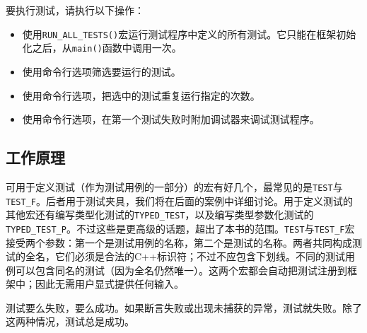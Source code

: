 
要执行测试，请执行以下操作：



\begin{itemize}
\item 使用\texttt{RUN\_\allowbreak{}ALL\_\allowbreak{}TESTS()}宏运行测试程序中定义的所有测试。它只能在框架初始化之后，从\texttt{main()}函数中调用一次。



\item 使用命令行选项筛选要运行的测试。



\item 使用命令行选项，把选中的测试重复运行指定的次数。



\item 使用命令行选项，在第一个测试失败时附加调试器来调试测试程序。

\end{itemize}



\subsection{工作原理}



可用于定义测试（作为测试用例的一部分）的宏有好几个，最常见的是\texttt{TEST}与\texttt{TEST\_\allowbreak{}F}。后者用于测试夹具，我们将在后面的案例中详细讨论。用于定义测试的其他宏还有编写类型化测试的\texttt{TYPED\_\allowbreak{}TEST}，以及编写类型参数化测试的\texttt{TYPED\_\allowbreak{}TEST\_\allowbreak{}P}。不过这些是更高级的话题，超出了本书的范围。\texttt{TEST}与\texttt{TEST\_\allowbreak{}F}宏接受两个参数：第一个是测试用例的名称，第二个是测试的名称。两者共同构成测试的全名，它们必须是合法的C++标识符；不过不应包含下划线。不同的测试用例可以包含同名的测试（因为全名仍然唯一）。这两个宏都会自动把测试注册到框架中；因此无需用户显式提供任何输入。



测试要么失败，要么成功。如果断言失败或出现未捕获的异常，测试就失败。除了这两种情况，测试总是成功。



